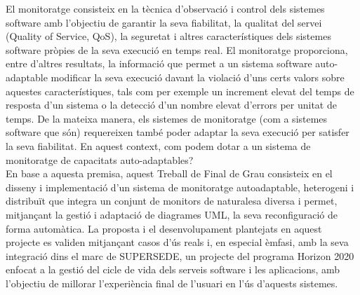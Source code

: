 \documentclass[
11pt, %
catalan, %
singlespacing, %
headsepline, %
chapterinoneline, %
table
]{MastersDoctoralThesis} %
\begin{document}
\begin{Abstracte}
El monitoratge consisteix en la tècnica d'observació i control dels sistemes software amb l'objectiu de garantir la seva fiabilitat, la qualitat del servei (Quality of Service, QoS), la seguretat i altres característiques dels sistemes software pròpies de la seva execució en temps real. El monitoratge proporciona, entre d'altres resultats, la informació que permet a un sistema software auto-adaptable modificar la seva execució davant la violació d'uns certs valors sobre aquestes característiques, tals com per exemple un increment elevat del temps de resposta d'un sistema o la detecció d'un nombre elevat d'errors per unitat de temps. De la mateixa manera, els sistemes de monitoratge (com a sistemes software que són) requereixen també poder adaptar la seva execució per satisfer la seva fiabilitat. En aquest context, com podem dotar a un sistema de monitoratge de capacitats auto-adaptables?\\

En base a aquesta premisa, aquest Treball de Final de Grau consisteix en el disseny i implementació d'un sistema de monitoratge autoadaptable, heterogeni i distribuït que integra un conjunt de monitors de naturalesa diversa i permet, mitjançant la gestió i adaptació de diagrames UML, la seva reconfiguració de forma automàtica. La proposta i el desenvolupament plantejats en aquest projecte es validen mitjançant casos d'ús reals i, en especial èmfasi, amb la seva integració dins el marc de SUPERSEDE, un projecte del programa Horizon 2020 enfocat a la gestió del cicle de vida dels serveis software i les aplicacions, amb l'objectiu de millorar l'experiència final de l'usuari en l'ús d'aquests sistemes. 
\end{Abstracte}



\end{document}
